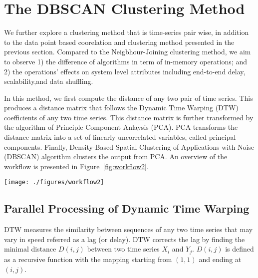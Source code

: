 \chapter{The DBSCAN Clustering Method}

We further explore a clustering method that is time-series pair wise, in addition to the data point based coorelation and clustering method presented in the previous section. Compared to the Neigbhour-Joining clustering method, we aim to observe 1) the difference of algorithms in term of in-memory operations; and 2) the operations' effects on system level attributes including end-to-end delay, scalability,and data shuffling. 

In this method, we first compute the distance of any two pair of time series. This produces a distance matrix that follows the Dynamic Time Warping (DTW) coefficients of any two time series. This distance matrix is further transformed by the algorithm of Principle Component Anlaysis (PCA). PCA transforms the distance matrix into a set of linearly uncorrelated variables,  called principal components. Finally, Density-Based Spatial Clustering of Applications with Noise (DBSCAN) algorithm clusters the output from PCA. An overview of the workflow is presented in Figure~\ref{fig:workflow2}.

\begin{figure*}
    \centering
	\texttt{[image: ./figures/workflow2]}
	{\caption{An overview of the DBSCAN clustering method. The left most represents the distance matrix of the input time series measured with DTW. PCA is then applied to reduce the dimentionality. These pairs of principle components from PCA are then projected into a two dimensional space where $X$ axis is component 1 and $Y$ axis is component 2. Finally, DBSCAN is applied to these points to find clusters.}
		\label{fig:workflow2}}
\end{figure*} 


\section{Parallel Processing of Dynamic Time Warping}

DTW measures the similarity between sequences of any two time series that may vary in speed referred as a lag (or delay).  DTW corrects the lag by finding the minimal distance $D(i,j)$ between two time series $X_i$ and $Y_j$. $D(i,j)$ is defined as a recursive function with the mapping starting from $(1,1)$ and ending at $(i,j)$. 

